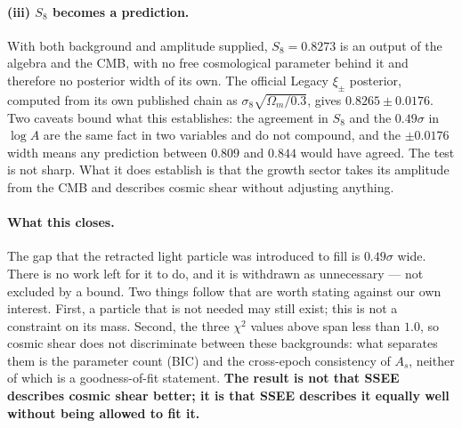 \documentclass[12pt,a4paper]{article}
\newcommand{\SSEE}{\textsc{SSEE}}
\begin{document}
\paragraph{(iii) $S_8$ becomes a prediction.} With both background and amplitude
supplied, $S_8=0.8273$ is an output of the algebra and the CMB, with no free
cosmological parameter behind it and therefore no posterior width of its own.
The official Legacy $\xi_\pm$ posterior, computed from its own published chain
as $\sigma_8\sqrt{\Omega_m/0.3}$, gives $0.8265\pm0.0176$. Two caveats bound
what this establishes: the agreement in $S_8$ and the $0.49\sigma$ in $\log A$
are the same fact in two variables and do not compound, and the $\pm0.0176$
width means any prediction between $0.809$ and $0.844$ would have agreed. The
test is not sharp. What it does establish is that the growth sector takes its
amplitude from the CMB and describes cosmic shear without adjusting anything.

\paragraph{What this closes.} The gap that the retracted light particle was
introduced to fill is $0.49\sigma$ wide. There is no work left for it to do, and
it is withdrawn as unnecessary --- not excluded by a bound. Two things follow
that are worth stating against our own interest. First, a particle that is not
needed may still exist; this is not a constraint on its mass. Second, the three
$\chi^2$ values above span less than $1.0$, so cosmic shear does not discriminate
between these backgrounds: what separates them is the parameter count (BIC) and
the cross-epoch consistency of $A_s$, neither of which is a goodness-of-fit
statement. \textbf{The result is not that \SSEE{} describes cosmic shear better;
it is that \SSEE{} describes it equally well without being allowed to fit it.}
\end{document}

